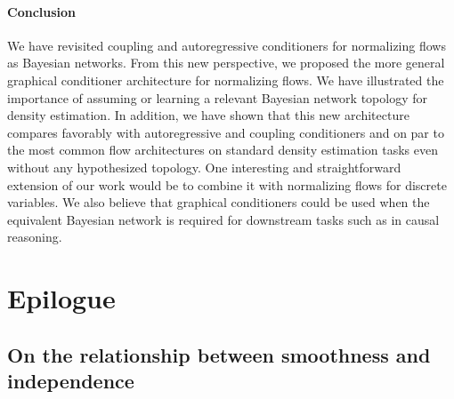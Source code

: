 
\paragraph{Conclusion}
We have revisited coupling and autoregressive conditioners for normalizing flows as Bayesian networks.
From this new perspective, we proposed the more general graphical conditioner architecture for normalizing flows. We have illustrated the importance of assuming or learning a relevant Bayesian network topology for density estimation. In addition, we have shown that this new architecture compares favorably with autoregressive and coupling conditioners and on par to the most common flow architectures on standard density estimation tasks even without any hypothesized topology. One interesting and straightforward extension of our work would be to combine it with normalizing flows for discrete variables.
We also believe that graphical conditioners could be used when the equivalent Bayesian network is required for downstream tasks such as in causal reasoning.

\section{Epilogue}
\subsection{On the relationship between smoothness and independence}
